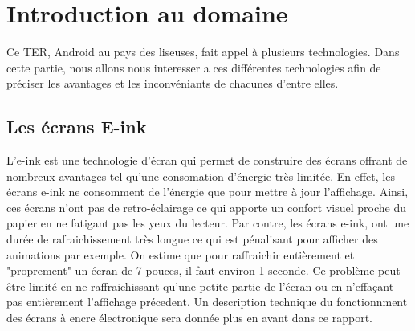\chapter{Introduction au domaine}
Ce TER, Android au pays des liseuses, fait appel à plusieurs technologies. Dans cette partie, nous allons nous interesser a ces différentes technologies afin de préciser les avantages et les inconvéniants de chacunes d'entre elles.
\section{Les écrans E-ink}
L'e-ink est une technologie d'écran qui permet de construire des écrans offrant de nombreux avantages tel qu'une consomation d'énergie très limitée. En effet, les écrans e-ink ne consomment de l'énergie que pour mettre à jour l'affichage. Ainsi, ces écrans n'ont pas de retro-éclairage ce qui apporte un confort visuel proche du papier en ne fatigant pas les yeux du lecteur. Par contre, les écrans e-ink, ont une durée de rafraichissement très longue ce qui est pénalisant pour afficher des animations par exemple. On estime que pour raffraichir entièrement et "proprement" un écran de 7 pouces, il faut environ 1 seconde. Ce problème peut être limité en ne raffraichissant qu'une petite partie de l'écran ou en n'effaçant pas entièrement l'affichage précedent. Un description technique du fonctionnment des écrans à encre électronique sera donnée plus en avant dans ce rapport.
\section{}